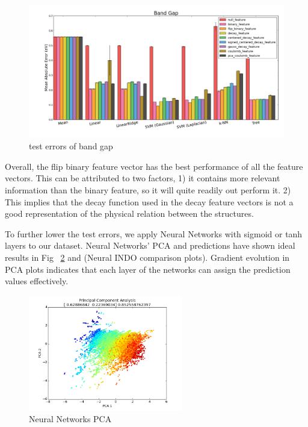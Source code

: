 \documentclass[12pt, oneside]{article}   	%
\begin{document}
\begin{figure}[H]
\begin{center}
\includegraphics [width=1\textwidth]{gap_results.png}
\caption{test errors of band gap}\label{gap}
\end{center}
\end{figure}
Overall, the flip binary feature vector has the best performance of all the feature vectors. This can be attributed to two factors, 1) it contains more relevant information than the binary feature, so it will quite readily out perform it. 2) This implies that the decay function used in the decay feature vectors is not a good representation of the physical relation between the structures.

To further lower the test errors, we apply Neural Networks with sigmoid or tanh layers to our dataset. Neural Networks' PCA and predictions have shown ideal results in Fig ~\ref{nnpca} and  (Neural INDO comparison plots). Gradient evolution in PCA plots indicates that each layer of the networks can assign the prediction values effectively. 

\begin{figure}[H]
\begin{center}
\includegraphics [width=0.6\textwidth]{07_conn.png}
\caption{Neural Networks PCA}\label{nnpca}
\end{center}
\end{figure}
\end{document}
